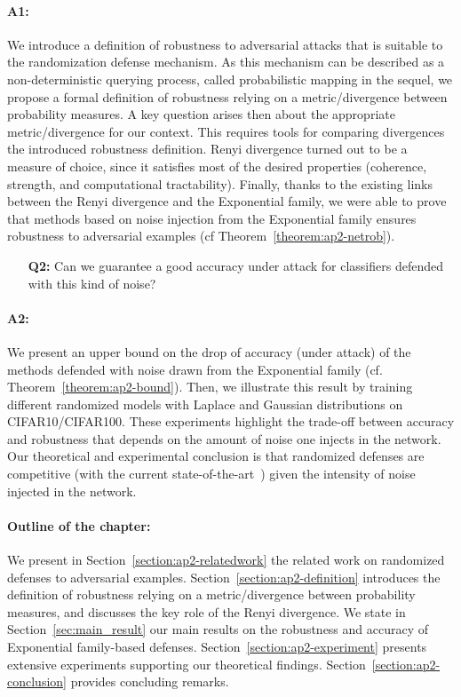 \paragraph{A1:}
We introduce a definition of robustness to adversarial attacks that is suitable to the randomization defense mechanism.
As this mechanism can be  described as a non-deterministic querying process, called probabilistic mapping in the sequel, we propose a formal definition of robustness relying on a metric/divergence between probability measures.
A key question arises then about the appropriate metric/divergence for our context.
This requires tools for comparing divergences \wrt the introduced robustness definition.
Renyi divergence turned out to be a measure of choice, since it satisfies most of the desired properties  (coherence, strength, and computational tractability).
Finally, thanks to the existing links between the Renyi divergence and the Exponential family, we were able to prove  that methods based on noise injection from the Exponential family  ensures robustness to adversarial examples (cf Theorem~\ref{theorem:ap2-netrob}). 
\begin{itemize}
    \item[\textbf{Q2:}] Can we guarantee a good accuracy under attack for classifiers defended with this kind of noise? 
\end{itemize}

\paragraph{A2:}
We present an upper bound on  the drop of accuracy (under attack) of the methods defended with noise drawn from the Exponential family (cf. Theorem~\ref{theorem:ap2-bound}).
Then, we illustrate this result by training different randomized models with Laplace and Gaussian distributions on CIFAR10/CIFAR100.
These experiments highlight the trade-off between accuracy and robustness that depends on the amount of noise one injects in the network.
Our theoretical and experimental conclusion is that randomized defenses are competitive (with the current state-of-the-art~\cite{madry2018towards}) given the intensity of noise injected in the network. 

\paragraph{Outline of the chapter:}
We present in Section~\ref{section:ap2-relatedwork} the related work on randomized defenses to adversarial examples.
Section~\ref{section:ap2-definition} introduces the definition of robustness relying on a metric/divergence between probability measures, and discusses the key role of the Renyi divergence.
We state in Section~\ref{sec:main_result} our main results on the robustness and accuracy of Exponential family-based defenses.
Section~\ref{section:ap2-experiment} presents extensive experiments supporting our theoretical findings.
Section~\ref{section:ap2-conclusion} provides concluding remarks.

